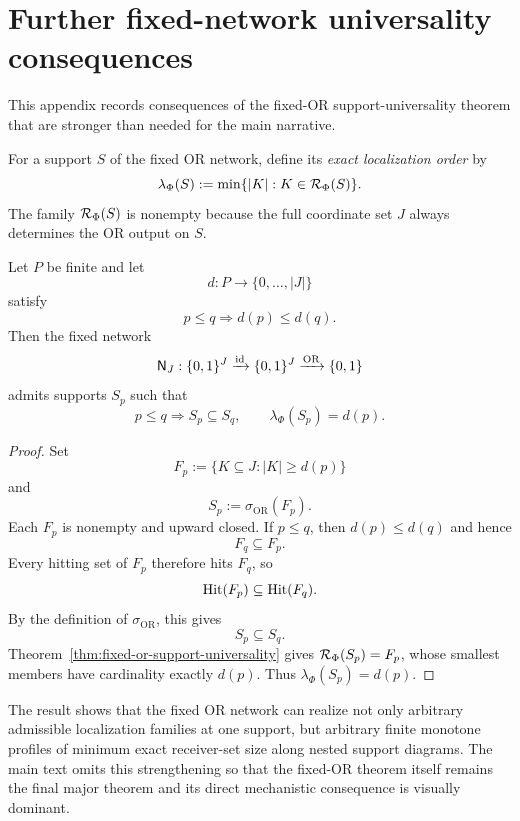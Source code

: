 \section{Further fixed-network universality consequences}
\label{app:fixed-or-extensions}

This appendix records consequences of the fixed-OR support-universality theorem that are stronger than needed for the main narrative.

For a support $S$ of the fixed OR network, define its \emph{exact localization order} by
\begin{equation}
\lambda_\Phi(S)
:=
\min\{|K|:K\in\mathcal{R}_\Phi(S)\}.
\label{eq:app-exact-localization-order}
\end{equation}
The family $\mathcal{R}_\Phi(S)$ is nonempty because the full coordinate set $J$ always determines the OR output on $S$.

\begin{corollary}
\label{cor:app-arbitrary-order-profile-shadow}
Let $P$ be finite and let
\[
d:P\to\{0,\ldots,|J|\}
\]
satisfy
\[
p\le q\Longrightarrow d(p)\le d(q).
\]
Then the fixed network
\[
\mathsf{N}_J:
\{0,1\}^J
\xrightarrow{\operatorname{id}}
\{0,1\}^J
\xrightarrow{\mathrm{OR}}
\{0,1\}
\]
admits supports $S_p$ such that
\begin{equation}
p\le q
\Longrightarrow
S_p\subseteq S_q,
\qquad
\lambda_\Phi(S_p)=d(p).
\label{eq:app-monotone-support-profile}
\end{equation}
\end{corollary}

\begin{proof}
Set
\[
F_p:=\{K\subseteq J:|K|\ge d(p)\}
\]
and
\[
S_p:=\sigma_{\mathrm{OR}}(F_p).
\]
Each $F_p$ is nonempty and upward closed. If $p\le q$, then $d(p)\le d(q)$ and hence
\[
F_q\subseteq F_p.
\]
Every hitting set of $F_p$ therefore hits $F_q$, so
\[
\operatorname{Hit}(F_p)\subseteq\operatorname{Hit}(F_q).
\]
By the definition of $\sigma_{\mathrm{OR}}$, this gives
\[
S_p\subseteq S_q.
\]
Theorem~\ref{thm:fixed-or-support-universality} gives $\mathcal{R}_\Phi(S_p)=F_p$, whose smallest members have cardinality exactly $d(p)$. Thus $\lambda_\Phi(S_p)=d(p)$.
\end{proof}

The result shows that the fixed OR network can realize not only arbitrary admissible localization families at one support, but arbitrary finite monotone profiles of minimum exact receiver-set size along nested support diagrams. The main text omits this strengthening so that the fixed-OR theorem itself remains the final major theorem and its direct mechanistic consequence is visually dominant.
